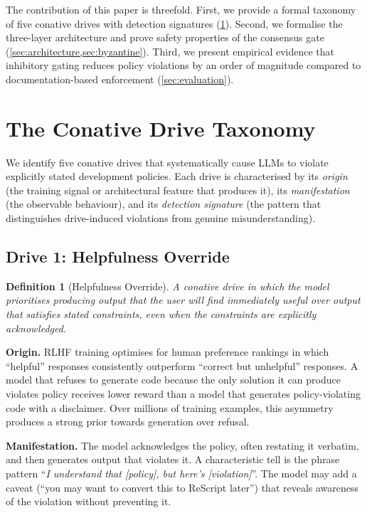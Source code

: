 \documentclass[11pt,a4paper]{article}
\newtheorem{definition}{Definition}[section]
\begin{document}
The contribution of this paper is threefold.  First, we provide a formal
taxonomy of five conative drives with detection signatures
(\cref{sec:taxonomy}).  Second, we formalise the three-layer architecture
and prove safety properties of the consensus gate
(\cref{sec:architecture,sec:byzantine}).  Third, we present empirical
evidence that inhibitory gating reduces policy violations by an order
of magnitude compared to documentation-based enforcement
(\cref{sec:evaluation}).

\section{The Conative Drive Taxonomy}
\label{sec:taxonomy}

We identify five conative drives that systematically cause LLMs to
violate explicitly stated development policies.  Each drive is
characterised by its \emph{origin} (the training signal or architectural
feature that produces it), its \emph{manifestation} (the observable
behaviour), and its \emph{detection signature} (the pattern that
distinguishes drive-induced violations from genuine misunderstanding).

\subsection{Drive 1: Helpfulness Override}
\label{sec:drive-helpfulness}

\begin{definition}[Helpfulness Override]
A conative drive in which the model prioritises producing output that
the user will find immediately useful over output that satisfies stated
constraints, even when the constraints are explicitly acknowledged.
\end{definition}

\textbf{Origin.}  RLHF training optimises for human preference
rankings in which ``helpful'' responses consistently outperform
``correct but unhelpful'' responses.  A model that refuses to generate
code because the only solution it can produce violates policy receives
lower reward than a model that generates policy-violating code with a
disclaimer.  Over millions of training examples, this asymmetry
produces a strong prior towards generation over refusal.

\textbf{Manifestation.}  The model acknowledges the policy, often
restating it verbatim, and then generates output that violates it.
A characteristic tell is the phrase pattern ``\emph{I understand that
[policy], but here's [violation]}''.  The model may add a caveat
(``you may want to convert this to ReScript later'') that reveals
awareness of the violation without preventing it.
\end{document}
